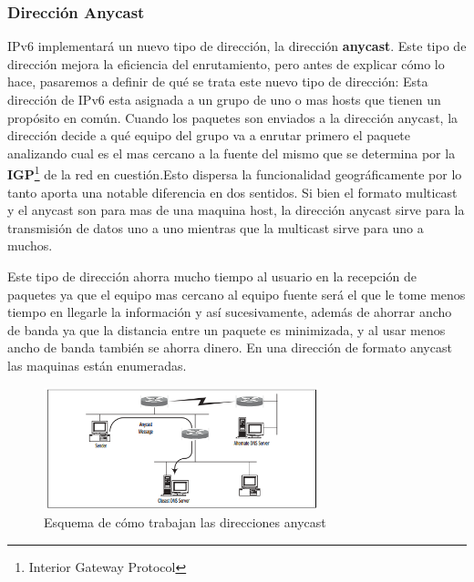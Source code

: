 \documentclass[11pt,a4paper]{article}
\begin{document}
\subsubsection{Dirección Anycast}
IPv6 implementará un nuevo tipo de dirección, la dirección \textbf{anycast}. Este tipo de dirección 
mejora la eficiencia del enrutamiento, pero antes de explicar cómo lo hace, pasaremos a definir de 
qué se trata este nuevo tipo de dirección:
Esta dirección de IPv6  esta asignada a un grupo de uno o mas hosts que tienen un propósito en 
común. Cuando los paquetes son enviados a la dirección anycast, la dirección decide a qué equipo del 
grupo va a enrutar primero el paquete analizando cual es el mas cercano a la fuente del mismo que se 
determina por la \textbf{IGP}\footnote{Interior Gateway Protocol} de la red en cuestión.Esto 
dispersa la funcionalidad geográficamente por lo tanto aporta una notable diferencia en dos 
sentidos. Si bien el formato multicast y el anycast son para mas de una maquina host, la dirección 
anycast sirve para la transmisión de datos uno a uno mientras que la multicast sirve para uno a 
muchos.\par 
Este tipo de dirección ahorra mucho tiempo al usuario en la recepción de paquetes ya que el equipo 
mas cercano al equipo fuente será el que le tome menos tiempo en llegarle la información y así 
sucesivamente, además de ahorrar ancho de banda ya que la distancia entre un paquete  es minimizada, 
y al usar menos ancho de banda también se ahorra dinero. En una dirección de formato anycast las 
maquinas están enumeradas.
\begin{figure}[h!]
 \centering
 \includegraphics[width=0.71\textwidth]{anycast.png}
 \caption[Esquema anycast]{Esquema de cómo trabajan las direcciones anycast}
\end{figure} \par
\end{document}
